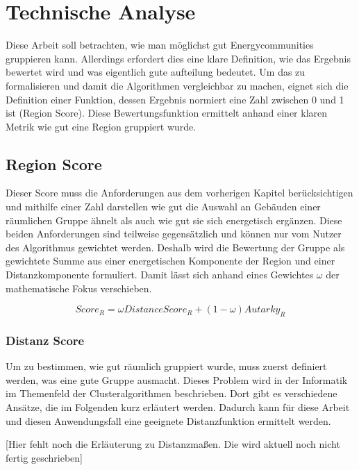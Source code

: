 \chapter{Technische Analyse}

Diese Arbeit soll betrachten, wie man möglichst gut Energycommunities gruppieren kann. Allerdings erfordert dies eine klare Definition, wie das Ergebnis bewertet wird und was eigentlich gute aufteilung bedeutet. Um das zu formalisieren und damit die Algorithmen vergleichbar zu machen, eignet sich die Definition einer Funktion, dessen Ergebnis normiert eine Zahl zwischen 0 und 1 ist (Region Score). Diese Bewertungsfunktion ermittelt anhand einer klaren Metrik wie gut eine Region gruppiert wurde.

\section{Region Score}
Dieser Score muss die Anforderungen aus dem vorherigen Kapitel berücksichtigen und mithilfe einer Zahl darstellen wie gut die Auswahl an Gebäuden einer räumlichen Gruppe ähnelt als auch wie gut sie sich energetisch ergänzen. Diese beiden Anforderungen sind teilweise gegensätzlich und können nur vom Nutzer des Algorithmus gewichtet werden. Deshalb wird die Bewertung der Gruppe als gewichtete Summe aus einer energetischen Komponente der Region und einer Distanzkomponente formuliert. Damit lässt sich anhand eines Gewichtes $\omega$ der mathematische Fokus verschieben.

\begin{equation}
    Score_{R} = \omega DistanceScore_{R} + (1-\omega)Autarky_{R}
\end{equation}

\subsection{Distanz Score}

Um zu bestimmen, wie gut räumlich gruppiert wurde, muss zuerst definiert werden, was eine gute Gruppe ausmacht. Dieses Problem wird in der Informatik im Themenfeld der Clusteralgorithmen beschrieben. Dort gibt es verschiedene Ansätze, die im Folgenden kurz erläutert werden. Dadurch kann für diese Arbeit und diesen Anwendungsfall eine geeignete Distanzfunktion ermittelt werden. 

[Hier fehlt noch die Erläuterung zu Distanzmaßen. Die wird aktuell noch nicht fertig geschrieben]

